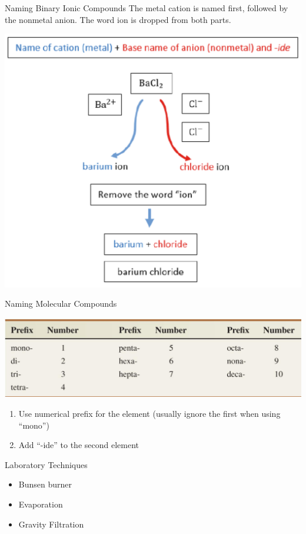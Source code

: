 \documentclass[11pt]{beamer}
\begin{document}
\begin{frame}{Naming Binary Ionic Compounds}
  The metal cation is named first, followed by the nonmetal anion.
  The word ion is dropped from both parts.

  \centering
  \includegraphics[width=0.7\linewidth]{barium_examp.png}
\end{frame}

\begin{frame}{Naming Molecular Compounds}
  \begin{center}
    \includegraphics[width=\linewidth]{prefix_name}
  \end{center}
  
  \begin{enumerate}
  \item Use numerical prefix for the element (usually ignore the first
    when using ``mono'')
  \item Add ``-ide'' to the second element
  \end{enumerate}
\end{frame}

\begin{frame}{Laboratory Techniques}
  \begin{itemize}
  \item Bunsen burner
  \item Evaporation
  \item Gravity Filtration
  \end{itemize}
\end{frame}
\end{document}
